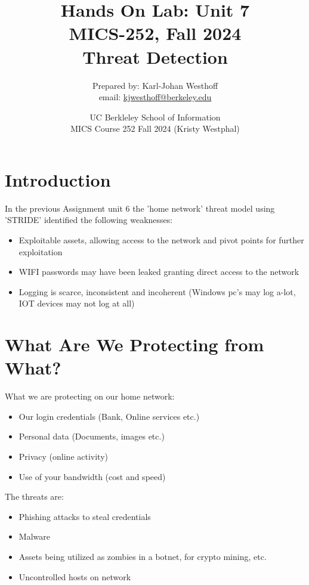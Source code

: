 \documentclass[
	letterpaper, %
	10pt, %
	unnumberedsections, %
	twoside, %
]{APAAssignment}
\title{Hands On Lab: Unit 7 \\ MICS-252, Fall 2024 \\ Threat Detection} %
\date{UC Berkleley School of Information \\
MICS Course 252 Fall 2024 (Kristy Westphal)
}
\author{
	Prepared by: Karl-Johan Westhoff \\
	email: \href{mailto:kjwesthoff@berkeley.edu}{kjwesthoff@berkeley.edu}
}
\begin{document}
\onecolumn
\maketitle %



\section{Introduction}
In the previous Assignment unit 6 \cite{Assingnment6} the 'home network' threat model using 'STRIDE' identified the following weaknesses:

\begin{spacing}{1}
	\begin{itemize}
		\item Exploitable assets, allowing access to the network and pivot points for further exploitation
		\item WIFI passwords may have been leaked granting direct access to the network
		\item Logging is scarce, inconsistent and incoherent (Windows pc's may log a-lot, IOT devices may not log at all)
	\end{itemize}
\end{spacing}

\section{What Are We Protecting from What?}
What we are protecting on our home network:
\begin{spacing}{1}
	\begin{itemize}
		\item Our login credentials (Bank, Online services etc.)
		\item Personal data (Documents, images etc.)
		\item Privacy (online activity)
		\item Use of your bandwidth (cost and speed)
	\end{itemize}
\end{spacing}

The threats are:

\begin{spacing}{1}
	\begin{itemize}
		\item Phishing attacks to steal credentials
		\item Malware
		\item Assets being utilized as zombies in a botnet, for crypto mining, etc.
		\item Uncontrolled hosts on network
	\end{itemize}
\end{spacing}
\end{document}
